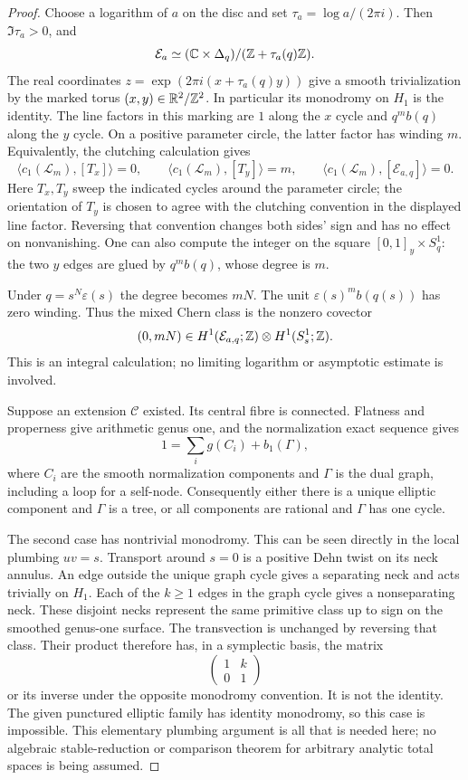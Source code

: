 \begin{proof}
Choose a logarithm of $a$ on the disc and set
$\tau_a=\log a/(2\pi i)$.  Then $\Im\tau_a>0$, and
\[
 \mathcal E_a\simeq
 (\mathbb C\times\Delta_q)/(\mathbb Z+\tau_a(q)\mathbb Z).
\]
The real coordinates $z=\exp(2\pi i(x+\tau_a(q)y))$
give a smooth trivialization by the marked torus
$(x,y)\in\mathbb R^2/\mathbb Z^2$.  In particular its monodromy on
$H_1$ is the identity.  The line factors in this marking
are $1$ along the $x$ cycle and $q^m b(q)$ along the
$y$ cycle.  On a positive parameter circle, the latter
factor has winding $m$.  Equivalently, the clutching
calculation gives
\[
 \langle c_1(\mathcal L_m),[T_x]\rangle=0,
 \qquad
 \langle c_1(\mathcal L_m),[T_y]\rangle=m,
 \qquad
 \langle c_1(\mathcal L_m),[\mathcal E_{a,q}]\rangle=0.
\]
Here $T_x,T_y$ sweep the indicated cycles around the
parameter circle; the orientation of $T_y$ is chosen to
agree with the clutching convention in the displayed
line factor.  Reversing that convention changes both
sides' sign and has no effect on nonvanishing.  One can
also compute the integer on the square
$[0,1]_y\times S^1_q$: the two $y$ edges are glued by
$q^m b(q)$, whose degree is $m$.

Under $q=s^N\varepsilon(s)$ the degree becomes $mN$.
The unit $\varepsilon(s)^m b(q(s))$ has zero winding.
Thus the mixed Chern class is the nonzero covector
\[
  (0,mN)\in
 H^1(\mathcal E_{a,q};\mathbb Z)\otimes H^1(S_s^1;\mathbb Z).
\]
This is an integral calculation; no limiting logarithm
or asymptotic estimate is involved.

Suppose an extension $\mathcal C$ existed.  Its central
fibre is connected.  Flatness and properness give arithmetic
genus one, and the normalization exact sequence gives
\[
 1=\sum_i g(C_i)+b_1(\Gamma),
\]
where $C_i$ are the smooth normalization components and
$\Gamma$ is the dual graph, including a loop for a
self-node.  Consequently either there is a unique
elliptic component and $\Gamma$ is a tree, or all
components are rational and $\Gamma$ has one cycle.

The second case has nontrivial monodromy.  This can be
seen directly in the local plumbing $uv=s$.  Transport
around $s=0$ is a positive Dehn twist on its neck annulus.
An edge outside the unique graph cycle gives a separating
neck and acts trivially on $H_1$.  Each of the $k\ge1$
edges in the graph cycle gives a nonseparating neck.
These disjoint necks represent the same primitive class
up to sign on the smoothed genus-one surface.  The
transvection is unchanged by reversing that class.
Their product therefore has, in a symplectic basis, the
matrix
\[
  \begin{pmatrix}1&k\\0&1\end{pmatrix}
\]
or its inverse under the opposite monodromy convention.
It is not the identity.  The given punctured elliptic
family has identity monodromy, so this case is impossible.
This elementary plumbing argument is all that is needed
here; no algebraic stable-reduction or comparison theorem
for arbitrary analytic total spaces is being assumed.


\end{proof}
